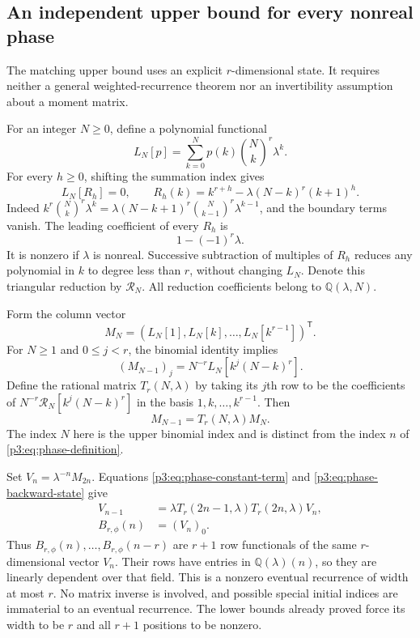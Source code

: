 \documentclass[11pt,a4paper]{article}
\theoremstyle{definition}
\theoremstyle{remark}
\numberwithin{equation}{section}
\begin{document}
\subsection{An independent upper bound for every nonreal phase}

The matching upper bound uses an explicit $r$-dimensional state.
It requires neither a general weighted-recurrence theorem nor an
invertibility assumption about a moment matrix.

For an integer $N\geq0$, define a polynomial functional
\[
 L_N[p]=\sum_{k=0}^{N}p(k)\binom Nk^r\lambda^k.
\]
For every $h\geq0$, shifting the summation index gives
\begin{equation}\label{p3:eq:phase-reduction-identity}
 L_N[R_h]=0,
 \qquad
 R_h(k)=k^{r+h}-\lambda(N-k)^r(k+1)^h.
\end{equation}
Indeed $k^r\binom Nk^r\lambda^k
=\lambda(N-k+1)^r\binom N{k-1}^r\lambda^{k-1}$,
and the boundary terms vanish.
The leading coefficient of every $R_h$ is
\begin{equation}\label{p3:eq:phase-reduction-leading}
 1-(-1)^r\lambda.
\end{equation}
It is nonzero if $\lambda$ is nonreal. Successive subtraction of
multiples of $R_h$ reduces any polynomial in $k$ to degree less than
$r$, without changing $L_N$. Denote this triangular reduction by
$\mathcal R_N$. All reduction coefficients belong to
$\mathbb Q(\lambda,N)$.

Form the column vector
\[
 M_N=(L_N[1],L_N[k],\ldots,L_N[k^{r-1}])^{\mathsf T}.
\]
For $N\geq1$ and $0\leq j<r$, the binomial identity implies
\[
 (M_{N-1})_j=N^{-r}L_N[k^j(N-k)^r].
\]
Define the rational matrix $T_r(N,\lambda)$ by taking its $j$th row
to be the coefficients of
$N^{-r}\mathcal R_N[k^j(N-k)^r]$ in the basis
$1,k,\ldots,k^{r-1}$. Then
\begin{equation}\label{p3:eq:phase-backward-state}
 M_{N-1}=T_r(N,\lambda)M_N.
\end{equation}
The index $N$ here is the upper binomial index and is distinct from
the index $n$ of \eqref{p3:eq:phase-definition}.

Set $V_n=\lambda^{-n}M_{2n}$. Equations
\eqref{p3:eq:phase-constant-term} and \eqref{p3:eq:phase-backward-state}
give
\begin{equation}\label{p3:eq:phase-even-state}
 \begin{split}
 V_{n-1}&=\lambda T_r(2n-1,\lambda)T_r(2n,\lambda)V_n,\\
 B_{r,\phi}(n)&=(V_n)_0.
 \end{split}
\end{equation}
Thus $B_{r,\phi}(n),\ldots,B_{r,\phi}(n-r)$ are $r+1$ row
functionals of the same $r$-dimensional vector $V_n$. Their rows
have entries in $\mathbb Q(\lambda)(n)$, so they are linearly
dependent over that field. This is a nonzero eventual recurrence
of width at most $r$. No matrix inverse is involved, and possible
special initial indices are immaterial to an eventual recurrence.
The lower bounds already proved force its width to be $r$ and all
$r+1$ positions to be nonzero.
\end{document}
